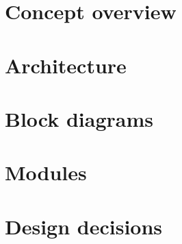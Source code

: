 \section{Concept overview}

\section{Architecture}

\section{Block diagrams}

\section{Modules}

\section{Design decisions}


